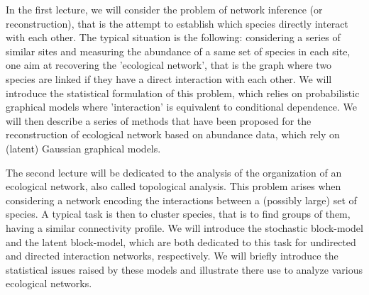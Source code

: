 In the first lecture, we will consider the problem of network inference (or reconstruction), that is the attempt to establish which species directly interact with each other. The typical situation is the following: considering a series of similar sites and measuring the abundance of a same set of species in each site, one aim at recovering the 'ecological network', that is the graph where two species are linked if they have a direct interaction with each other. We will introduce the statistical formulation of this problem, which relies on probabilistic graphical models where 'interaction' is equivalent to conditional dependence. We will then describe a series of methods that have been proposed for the reconstruction of ecological network based on abundance data, which rely on (latent) Gaussian graphical models.

The second lecture will be dedicated to the analysis of the organization of an ecological network, also called topological analysis. This problem arises when considering a network encoding the interactions between a (possibly large) set of species. A typical task is then to cluster species, that is to find groups of them, having a similar connectivity profile. We will introduce the stochastic block-model and the latent block-model, which are both dedicated to this task for undirected and directed interaction networks, respectively. We will briefly introduce the statistical issues raised by these models and illustrate there use to analyze various ecological networks.

